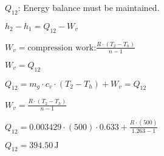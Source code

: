 \( Q_{12} \): Energy balance must be maintained.  

\( h_2 - h_1 = Q_{12} - W_v \)  

\( W_v = \text{compression work:} \frac{R \cdot (T_2 - T_h)}{n - 1} \)  

\( W_v = Q_{12} \)  

\( Q_{12} = m_g \cdot c_v \cdot (T_2 - T_h) + W_v = Q_{12} \)  

\( W_v = \frac{R \cdot (T_2 - T_h)}{n - 1} \)  

\( Q_{12} = 0.003429 \cdot (500) \cdot 0.633 + \frac{R \cdot (500)}{1.263 - 1} \)  

\( Q_{12} = 394.50 \, \text{J} \)